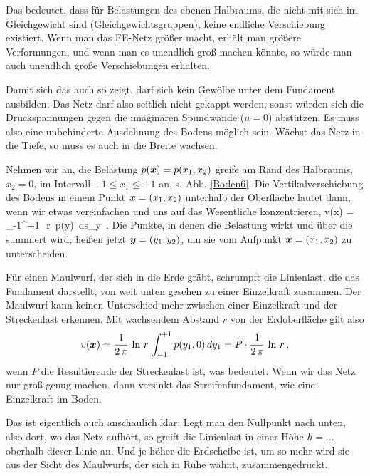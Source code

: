 {{Das bedeutet, dass f\"{u}r Belastungen des ebenen Halbraums, die nicht mit sich im Gleichgewicht sind (Gleichgewichtsgruppen), keine endliche Verschiebung existiert. Wenn man das FE-Netz gr\"{o}{\ss}er macht, erh\"{a}lt man gr\"{o}{\ss}ere Verformungen, und wenn man es unendlich gro{\ss} machen k\"{o}nnte, so w\"{u}rde man auch unendlich gro{\ss}e Verschiebungen erhalten.

Damit sich das auch so zeigt, darf sich kein Gew\"{o}lbe unter dem Fundament ausbilden. Das Netz darf also seitlich nicht gekappt werden, sonst w\"{u}rden sich die Druckspannungen gegen die imagin\"{a}ren Spundw\"{a}nde ($u = 0$) abst\"{u}tzen. Es muss also eine unbehinderte Ausdehnung des Bodens m\"{o}glich sein. W\"{a}chst das Netz in die Tiefe, so muss es auch in die Breite wachsen.

Nehmen wir an, die Belastung $p(\mbox{\boldmath $x$}) = p(x_1,x_2)$ greife am Rand des Halbraums, $x_2 = 0$, im Intervall $-1 \leq x_1 \leq +1$ an, s. Abb. \ref{Boden6}. Die Vertikalverschiebung des Bodens in einem Punkt $\mbox{\boldmath $x$} = (x_1,x_2)$ unterhalb der Oberfl\"{a}che lautet dann, wenn wir etwas vereinfachen und uns auf das Wesentliche konzentrieren,
\bfo
v(\vek x) = \int_{-1}^{+1}  \,\ln \,r \,p(\vek y) \,ds_{\vek y} \,.
\efo
Die Punkte, in denen die Belastung wirkt und \"{u}ber die summiert wird, hei{\ss}en jetzt $\mbox{\boldmath $y$} = (y_1,y_2)$, um sie vom Aufpunkt $\mbox{\boldmath $x$} = (x_1,x_2)$ zu unterscheiden.

F\"{u}r einen Maulwurf, der sich in die Erde gr\"{a}bt, schrumpft die Linienlast, die das Fundament darstellt, von weit unten gesehen zu einer Einzelkraft zusammen. Der Maulwurf kann keinen Unterschied mehr zwischen einer Einzelkraft und der Streckenlast erkennen. Mit wachsendem Abstand $r$ von der Erdoberfl\"{a}che gilt also
\begin{align}
v(\mbox{\boldmath $x$}) = \frac{1}{2\,\pi} \,\ln \,r \,\int_{-1}^{+1}p(y_1,0) \,dy_1 = P \cdot
\frac{1}{2\,\pi} \,\ln \,r \,,
\end{align}
wenn $P$ die Resultierende der Streckenlast ist, was bedeutet: Wenn wir das Netz nur gro{\ss} genug machen, dann versinkt das Streifenfundament, wie eine Einzelkraft im Boden.

Das ist eigentlich auch anschaulich klar: Legt man den Nullpunkt nach unten, also dort, wo das Netz aufh\"{o}rt, so greift die Linienlast in einer H\"{o}he $h = \ldots$ oberhalb dieser Linie an. Und je h\"{o}her die Erdscheibe ist, um so mehr wird sie aus der Sicht des Maulwurfs, der sich in Ruhe w\"{a}hnt, zusammengedr\"{u}ckt.

}}
